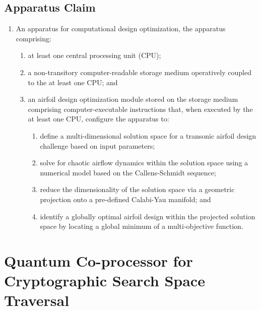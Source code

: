\documentclass{article}
\begin{document}
\subsection{Apparatus Claim}
\begin{enumerate}
    \item[1.] An apparatus for computational design optimization, the apparatus comprising:
    \begin{enumerate}
        \item[(a)] at least one central processing unit (CPU);
        \item[(b)] a non-transitory computer-readable storage medium operatively coupled to the at least one CPU; and
        \item[(c)] an airfoil design optimization module stored on the storage medium comprising computer-executable instructions that, when executed by the at least one CPU, configure the apparatus to:
        \begin{enumerate}
            \item[(i)] define a multi-dimensional solution space for a transonic airfoil design challenge based on input parameters;
            \item[(ii)] solve for chaotic airflow dynamics within the solution space using a numerical model based on the Callens-Schmidt sequence;
            \item[(iii)] reduce the dimensionality of the solution space via a geometric projection onto a pre-defined Calabi-Yau manifold; and
            \item[(iv)] identify a globally optimal airfoil design within the projected solution space by locating a global minimum of a multi-objective function.
        \end{enumerate}
    \end{enumerate}
\end{enumerate}

\section{Quantum Co-processor for Cryptographic Search Space Traversal}
\end{document}
